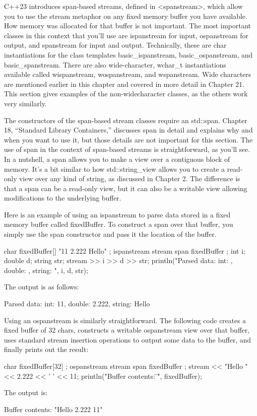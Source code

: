 

C++23 introduces span-based streams, defined in <spanstream>, which allow you to use the stream metaphor on any fixed memory buffer you have available. How memory was allocated for that buffer is not important. The most important classes in this context that you’ll use are ispanstream for input, ospanstream for output, and spanstream for input and output. Technically, these are char instantiations for the class templates basic\_ispanstream, basic\_ospanstream, and basic\_spanstream. There are also wide-character, wchar\_t instantiations available called wispanstream, wospanstream, and wspanstream. Wide characters are mentioned earlier in this chapter and covered in more detail in Chapter 21. This section gives examples of the non-widecharacter classes, as the others work very similarly.

The constructors of the span-based stream classes require an std::span. Chapter 18, “Standard Library Containers,” discusses span in detail and explains why and when you want to use it, but those details are not important for this section. The use of span in the context of span-based streams is straightforward, as you’ll see. In a nutshell, a span allows you to make a view over a contiguous block of memory. It’s a bit similar to how std::string\_view allows you to create a read-only view over any kind of string, as discussed in Chapter 2. The difference is that a span can be a read-only view, but it can also be a writable view allowing modifications to the underlying buffer.

Here is an example of using an ispanstream to parse data stored in a fixed memory buffer called fixedBuffer. To construct a span over that buffer, you simply use the span constructor and pass it the location of the buffer.

\begin{cpp}
char fixedBuffer[] { "11 2.222 Hello" };
ispanstream stream { span { fixedBuffer } };
int i; double d; string str;
stream >> i >> d >> str;
println("Parsed data: int: {}, double: {}, string: {}", i, d, str);
\end{cpp}

The output is as follows:

\begin{shell}
Parsed data: int: 11, double: 2.222, string: Hello
\end{shell}

Using an ospanstream is similarly straightforward. The following code creates a fixed buffer of 32 chars, constructs a writable ospanstream view over that buffer, uses standard stream insertion operations to output some data to the buffer, and finally prints out the result:

\begin{cpp}
char fixedBuffer[32] {};
ospanstream stream { span { fixedBuffer } };
stream << "Hello " << 2.222 << ' ' << 11;
println("Buffer contents: \"{}\"", fixedBuffer);
\end{cpp}

The output is:

\begin{shell}
Buffer contents: "Hello 2.222 11"
\end{shell}






